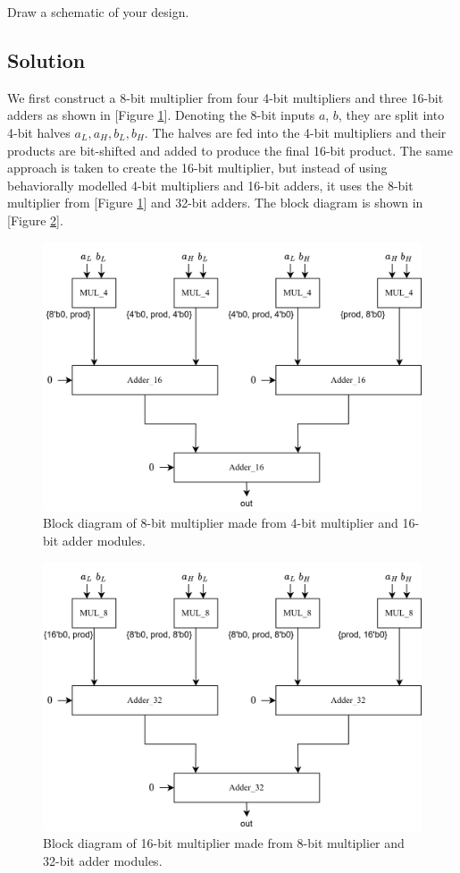 \documentclass[../main.tex]{subfiles}
\begin{document}
Draw a schematic of your design.

\subsection*{Solution}

We first construct a 8-bit multiplier from four 4-bit multipliers and three 16-bit adders as shown in [Figure \ref{q9_1}]. Denoting the 8-bit inputs $a$, $b$, they are split into 4-bit halves $a_L, a_H, b_L, b_H$. The halves are fed into the 4-bit multipliers and their products are bit-shifted and added to produce the final 16-bit product. The same approach is taken to create the 16-bit multiplier, but instead of using behaviorally modelled 4-bit multipliers and 16-bit adders, it uses the 8-bit multiplier from [Figure \ref{q9_1}] and 32-bit adders. The block diagram is shown in [Figure \ref{q9_2}].

\begin{figure}[h]
    \centering
    \includegraphics[width=0.6\linewidth]{assets/mul_8.png}
    \caption{Block diagram of 8-bit multiplier made from 4-bit multiplier and 16-bit adder modules.}
    \label{q9_1}
\end{figure}

\begin{figure}[h]
    \centering
    \includegraphics[width=0.6\linewidth]{assets/mul_16.png}
    \caption{Block diagram of 16-bit multiplier made from 8-bit multiplier and 32-bit adder modules.}
    \label{q9_2}
\end{figure}
\end{document}
